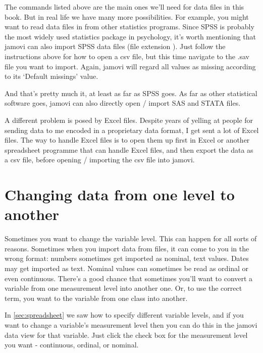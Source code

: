 
The commands listed above are the main ones we'll need for data files in this book. But in real life we have many more possibilities. For example, you might want to read data files in from other statistics programs. Since SPSS is probably the most widely used statistics package in psychology, it's worth mentioning that jamovi can also import SPSS data files (file extension ). Just follow the instructions above for how to open a csv file, but this time navigate to the .sav file you want to import. Again, jamovi will regard all values as missing according to its `Default missings' value.

And that's pretty much it, at least as far as SPSS goes.  As far as other statistical software goes, jamovi can also directly open / import SAS and STATA files. 



A different problem is posed by Excel files. Despite years of yelling at people for sending data to me encoded in a proprietary data format, I get sent a lot of Excel files. The way to handle Excel files is to open them up first in Excel or another spreadsheet programme that can handle Excel files, and then export the data as a csv file, before opening / importing the csv file into jamovi. 


\section{Changing data from one level to another\label{sec:coercion}}

Sometimes you want to change the variable level. This can happen for all sorts of reasons. Sometimes when you import data from files, it can come to you in the wrong format: numbers sometimes get imported as nominal, text values. Dates may get imported as text. Nominal values can sometimes be read as ordinal or even continuous. There's a good chance that sometimes you'll want to convert a variable from one measurement level into another one. Or, to use the correct term, you want to  the variable from one class into another. 

In \ref{sec:spreadsheet} we saw how to specify different variable levels, and if you want to change a variable's measurement level then you can do this in the jamovi data view for that variable. Just click the check box for the measurement level you want - continuous, ordinal, or nominal. 


